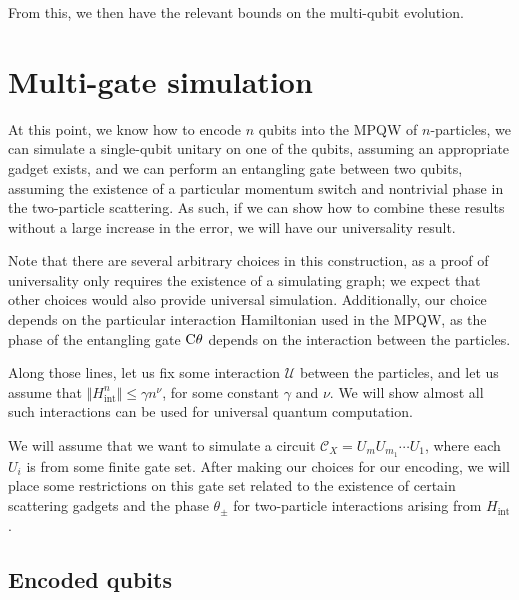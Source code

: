 \documentclass[../thesis-main/thesis-main]{subfiles}
\begin{document}
From this, we then have the relevant bounds on the multi-qubit evolution.

%

%

\section{Multi-gate simulation}\label{sec:MP_multi_gate_simulation}

At this point, we know how to encode $n$ qubits into the MPQW of $n$-particles, we can simulate a single-qubit unitary on one of the qubits, assuming an appropriate gadget exists, and we can perform an entangling gate between two qubits, assuming the existence of a particular momentum switch and nontrivial phase in the two-particle scattering.  As such, if we can show how to combine these results without a large increase in the error, we will have our universality result.

Note that there are several arbitrary choices in this construction, as a proof of universality only requires the existence of a simulating graph; we expect that other choices would also provide universal simulation.  Additionally, our choice depends on the particular interaction Hamiltonian used in the MPQW, as the phase of the entangling gate $\mathrm{C}\theta$ depends on the interaction between the particles.  

Along those lines, let us fix some interaction $\mathcal{U}$ between the particles, and let us assume that $\Vert H_{\text{int}}^n \Vert \leq \gamma n^\nu$, for some constant $\gamma$ and $\nu$.  We will show almost all such interactions can be used for universal quantum computation.

We will assume that we want to simulate a circuit $\mathcal{C}_X = U_mU_{m_1}\cdots U_1$, where each $U_i$ is from some finite gate set.  After making our choices for our encoding, we will place some restrictions on this gate set related to the existence of certain scattering gadgets and the phase $\theta_{\pm}$ for two-particle interactions arising from $H_{\text{int}}$.

\subsection{Encoded qubits}
\end{document}
